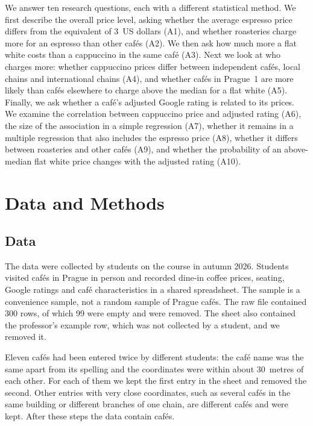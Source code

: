 \documentclass[11pt,a4paper]{article}
\begin{document}
We answer ten research questions, each with a different statistical method. We first describe the overall price level, asking whether the average espresso price differs from the equivalent of 3~US dollars (A1), and whether roasteries charge more for an espresso than other caf\'es (A2). We then ask how much more a flat white costs than a cappuccino in the same caf\'e (A3). Next we look at who charges more: whether cappuccino prices differ between independent caf\'es, local chains and international chains (A4), and whether caf\'es in Prague~1 are more likely than caf\'es elsewhere to charge above the median for a flat white (A5). Finally, we ask whether a caf\'e's adjusted Google rating is related to its prices. We examine the correlation between cappuccino price and adjusted rating (A6), the size of the association in a simple regression (A7), whether it remains in a multiple regression that also includes the espresso price (A8), whether it differs between roasteries and other caf\'es (A9), and whether the probability of an above-median flat white price changes with the adjusted rating (A10).

\FloatBarrier
\section{Data and Methods}

\FloatBarrier
\subsection{Data}

The data were collected by students on the course in autumn 2026. Students visited caf\'es in Prague in person and recorded dine-in coffee prices, seating, Google ratings and caf\'e characteristics in a shared spreadsheet. The sample is a convenience sample, not a random sample of Prague caf\'es. The raw file contained 300 rows, of which 99 were empty and were removed. The sheet also contained the professor's example row, which was not collected by a student, and we removed it.

Eleven caf\'es had been entered twice by different students: the caf\'e name was the same apart from its spelling and the coordinates were within about 30~metres of each other. For each of them we kept the first entry in the sheet and removed the second. Other entries with very close coordinates, such as several caf\'es in the same building or different branches of one chain, are different caf\'es and were kept. After these steps the data contain \ATotal{} caf\'es.
\end{document}
